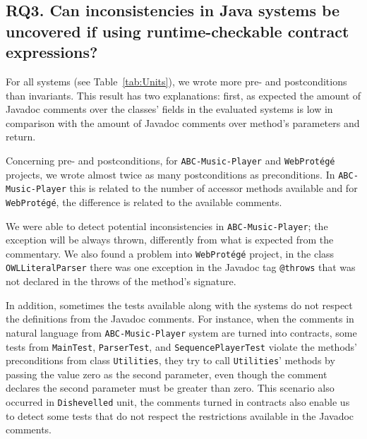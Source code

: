 \subsection{RQ3. Can inconsistencies in Java systems be uncovered if using runtime-checkable contract expressions?}
\label{rq3}


For all systems (see Table~\ref{tab:Units}), we
wrote more pre- and postconditions than invariants. This result has two
explanations: first, as expected the amount of Javadoc comments over the
classes' fields in the evaluated systems is low in comparison with the amount
of Javadoc comments over method's parameters and return.


Concerning pre- and postconditions, for \texttt{ABC-Music-Player} and
\texttt{WebProt\'{e}g\'{e}} projects, we wrote almost twice as many postconditions
as preconditions.
In \texttt{ABC-Music-Player} this is related to the number of accessor methods
available and for \texttt{WebProt\'{e}g\'{e}}, the difference is related to
the available comments.
%


We were able to detect potential inconsistencies in \texttt{ABC-Mu\-sic-Player};
the exception will be always thrown, differently from what is expected from the
commentary.
We also found a problem into
\texttt{WebProt\'{e}g\'{e}} project, in the class \texttt{OWLLiteralParser} there was one exception
in the Javadoc tag \texttt{@throws} that was not declared in the throws of the method's signature.

In addition, sometimes the tests available along with the systems do
not respect the definitions from the Javadoc comments. For instance, when the
comments in natural language from \texttt{ABC-Music-Player} system are turned into
\contractjdoc{} contracts, some tests from
\texttt{MainTest}, \texttt{ParserTest}, and \texttt{SequencePlayerTest} violate
the methods' preconditions from class \texttt{Utilities}, they try to
call \texttt{Utilities}' methods by passing the value zero as the second
parameter, even though the comment declares the second parameter must be greater than zero.
This scenario also occurred in \texttt{Dishevelled} unit, the comments turned
in \contractjdoc{} contracts also enable us to detect some tests
that do not respect the restrictions available in the Javadoc comments.


